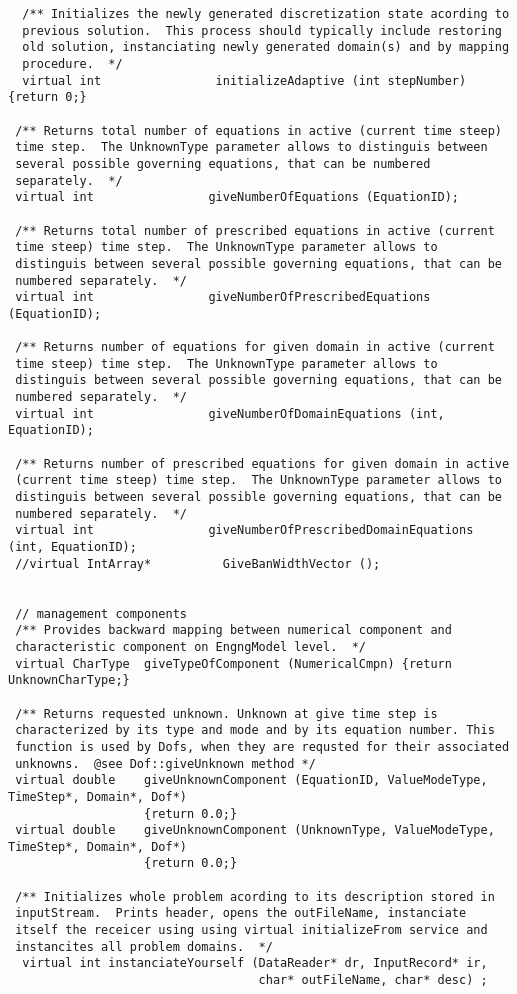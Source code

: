 \documentclass[a4paper]{article}
\begin{document}
{\begin{verbatim}
  /** Initializes the newly generated discretization state acording to
  previous solution.  This process should typically include restoring
  old solution, instanciating newly generated domain(s) and by mapping
  procedure.  */
  virtual int                initializeAdaptive (int stepNumber) {return 0;}

 /** Returns total number of equations in active (current time steep)
 time step.  The UnknownType parameter allows to distinguis between
 several possible governing equations, that can be numbered
 separately.  */
 virtual int                giveNumberOfEquations (EquationID);

 /** Returns total number of prescribed equations in active (current
 time steep) time step.  The UnknownType parameter allows to
 distinguis between several possible governing equations, that can be
 numbered separately.  */
 virtual int                giveNumberOfPrescribedEquations (EquationID);

 /** Returns number of equations for given domain in active (current
 time steep) time step.  The UnknownType parameter allows to
 distinguis between several possible governing equations, that can be
 numbered separately.  */
 virtual int                giveNumberOfDomainEquations (int, EquationID);

 /** Returns number of prescribed equations for given domain in active
 (current time steep) time step.  The UnknownType parameter allows to
 distinguis between several possible governing equations, that can be
 numbered separately.  */
 virtual int                giveNumberOfPrescribedDomainEquations (int, EquationID);
 //virtual IntArray*          GiveBanWidthVector ();
      

 // management components
 /** Provides backward mapping between numerical component and
 characteristic component on EngngModel level.  */
 virtual CharType  giveTypeOfComponent (NumericalCmpn) {return UnknownCharType;}

 /** Returns requested unknown. Unknown at give time step is
 characterized by its type and mode and by its equation number. This
 function is used by Dofs, when they are requsted for their associated
 unknowns.  @see Dof::giveUnknown method */
 virtual double    giveUnknownComponent (EquationID, ValueModeType, TimeStep*, Domain*, Dof*) 
                   {return 0.0;}
 virtual double    giveUnknownComponent (UnknownType, ValueModeType, TimeStep*, Domain*, Dof*) 
                   {return 0.0;}

 /** Initializes whole problem acording to its description stored in
 inputStream.  Prints header, opens the outFileName, instanciate
 itself the receicer using using virtual initializeFrom service and
 instancites all problem domains.  */
  virtual int instanciateYourself (DataReader* dr, InputRecord* ir, 
                                   char* outFileName, char* desc) ;


\end{verbatim}}
\end{document}
